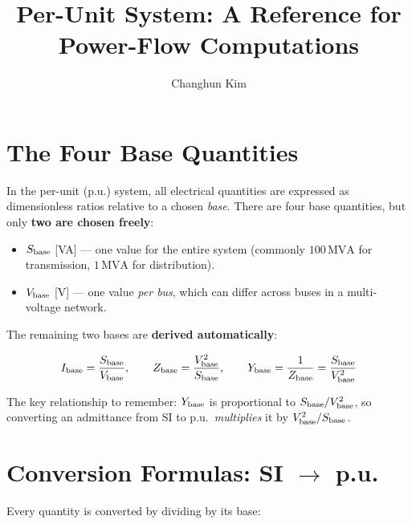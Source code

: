 \documentclass{article}
\title{Per-Unit System: A Reference for Power-Flow Computations}
\author{Changhun Kim}
\begin{document}
\maketitle

\section{The Four Base Quantities}

In the per-unit (p.u.) system, all electrical quantities are expressed as
dimensionless ratios relative to a chosen \emph{base}.  There are four base
quantities, but only \textbf{two are chosen freely}:

\begin{itemize}[noitemsep]
  \item $S_{\rm base}$ [VA] — one value for the entire system (commonly
    $100\,\mathrm{MVA}$ for transmission, $1\,\mathrm{MVA}$ for distribution).
  \item $V_{\rm base}$ [V] — one value \emph{per bus}, which can differ
    across buses in a multi-voltage network.
\end{itemize}

The remaining two bases are \textbf{derived automatically}:

\begin{equation}
  I_{\rm base} = \frac{S_{\rm base}}{V_{\rm base}},
  \qquad
  Z_{\rm base} = \frac{V_{\rm base}^2}{S_{\rm base}},
  \qquad
  Y_{\rm base} = \frac{1}{Z_{\rm base}} = \frac{S_{\rm base}}{V_{\rm base}^2}
  \label{eq:bases}
\end{equation}

The key relationship to remember: $Y_{\rm base}$ is proportional to
$S_{\rm base}/V_{\rm base}^2$, so converting an admittance from SI to p.u.\
\emph{multiplies} it by $V_{\rm base}^2/S_{\rm base}$.

\section{Conversion Formulas: SI $\to$ p.u.}

Every quantity is converted by dividing by its base:
\end{document}
